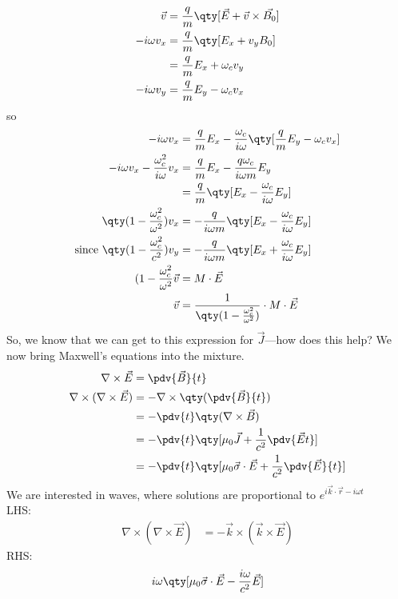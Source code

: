 \documentclass{book}         		                %
\begin{document}
\begin{align*}
  \vec{v} &= \frac{q}{m} \qty[ \vec{E} + \vec{v} \times \vec{B_0}]\\
-i \omega v_x &= \frac{q}{m} \qty[ E_x + v_yB_0] \\
&= \frac{q}{m}E_x + \omega_cv_y \\
-i \omega v_y &= \frac{q}{m}E_y - \omega_cv_x
\end{align*}
so
\begin{align*}
  -i\omega v_x &= \frac{q}{m} E_x - \frac{\omega_c}{i \omega} \qty[ \frac{q}{m}E_y - \omega_cv_x] \\
-i \omega v_x - \frac{\omega_c^2}{i \omega} v_x &= \frac{q}{m} E_x - \frac{q \omega_c}{i \omega m}E_y \\
&= \frac{q}{m}\qty[E_x - \frac{\omega_c}{i \omega} E_y] \\
\qty(1 - \frac{\omega_c^2}{\omega^2}) v_x &= - \frac{q}{i \omega m} \qty[E_x - \frac{\omega_c}{i \omega}E_y] \\
\text{since } \qty(1- \frac{\omega_c^2}{c^2}) v_y &= - \frac{q}{i \omega m} \qty[ E_x + \frac{\omega_c}{i \omega} E_y] \\
(1 - \frac{\omega_c^2}{\omega^2} \vec{v} &= M \cdot \vec{E} \\
\vec{v} &= \frac{1}{\qty(1 - \frac{\omega_{c}^2}{\omega^2})} \cdot M \cdot \vec{E}
\end{align*}
So, we know that we can get to this expression for $\vec{J}$---how does this help? We now bring Maxwell's equations into the mixture.
\begin{align*}
 \nabla \times \vec{E} &= \pdv{\vec{B}}{t} \\
\nabla \times ( \nabla \times \vec{E}) &= - \nabla \times \qty( \pdv{\vec{B}}{t}) \\
&= - \pdv{t} \qty(\nabla \times \vec{B}) \\
&= - \pdv{t} \qty[\mu_0 \vec{J} + \frac{1}{c^2} \pdv{\vec{E}{t}}] \\
&= - \pdv{t} \qty[\mu_0 \vec{\sigma} \cdot \vec{E} + \frac{1}{c^2} \pdv{\vec{E}}{t}]
\end{align*}
We are interested in waves, where solutions are proportional to $e^{i \vec{k}\cdot \vec{r} - i \omega t}$ \\
LHS: \\
\begin{align*}
  \nabla \times (\nabla \times \vec{E}) &= - \vec{k} \times (\vec{k} \times \vec{E})
\end{align*}
RHS: \\
\begin{align*}
  i \omega \qty[ \mu_0 \vec{\sigma} \cdot \vec{E} - \frac{i \omega}{c^2} \vec{E}]
\end{align*}
\end{document}

